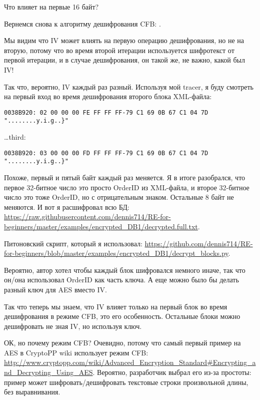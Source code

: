 Что влияет на первые 16 байт?

Вернемся снова к алгоритму дешифрования \ac{CFB}: .

Мы видим что \ac{IV} может влиять на первую операцию дешифрования, но не на вторую,
потому что во время второй итерации используется шифротекст от первой итерации, и в случае дешифрования,
он такой же, не важно, какой был \ac{IV}!

Так что, вероятно, \ac{IV} каждый раз разный.
Используя мой tracer, я буду смотреть на первый вход во время дешифрования второго блока \ac{XML}-файла:

\begin{lstlisting}
0038B920: 02 00 00 00 FE FF FF FF-79 C1 69 0B 67 C1 04 7D "........y.i.g..}"
\end{lstlisting}

\dots third:

\begin{lstlisting}
0038B920: 03 00 00 00 FD FF FF FF-79 C1 69 0B 67 C1 04 7D "........y.i.g..}"
\end{lstlisting}

Похоже, первый и пятый байт каждый раз меняется.
Я в итоге разобрался, что первое 32-битное число это просто OrderID из \ac{XML}-файла,
и второе 32-битное число это тоже OrderID, но с отрицательным знаком. Остальные 8 байт не меняются.
И вот я расшифровал всю БД:
\url{https://raw.githubusercontent.com/dennis714/RE-for-beginners/master/examples/encrypted_DB1/decrypted.full.txt}.

Питоновский скрипт, который я использовал:
\url{https://github.com/dennis714/RE-for-beginners/blob/master/examples/encrypted_DB1/decrypt_blocks.py}.

Вероятно, автор хотел чтобы каждый блок шифровался немного иначе, так что он/она использовал OrderID как часть ключа.
А еще можно было бы делать разный ключ для AES вместо \ac{IV}.

Так что теперь мы знаем, что \ac{IV} влияет только на первый блок во время дешифрования в режиме \ac{CFB},
это его особенность.
Остальные блоки можно дешифровать не зная \ac{IV}, но используя ключ.

ОК, но почему режим \ac{CFB}? Очевидно, потому что самый первый пример на AES в CryptoPP wiki
использует режим \ac{CFB}:
\url{http://www.cryptopp.com/wiki/Advanced_Encryption_Standard#Encrypting_and_Decrypting_Using_AES}.
Вероятно, разработчик выбрал его из-за простоты:
пример может шифровать/дешифровать текстовые строки произвольной длины, без выравнивания.

